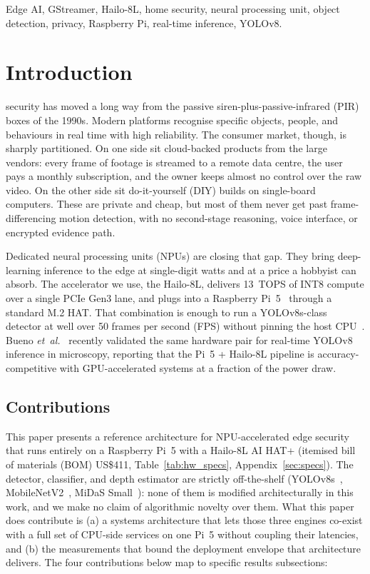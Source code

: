 \documentclass{ieeeaccess}
\begin{document}
\begin{keywords}
Edge AI, GStreamer, Hailo-8L, home security, neural processing unit, object detection, privacy, Raspberry Pi, real-time inference, YOLOv8.
\end{keywords}

\titlepgskip=-21pt

\maketitle

\section{Introduction}
\label{sec:introduction}
 security has moved a long way from the passive siren-plus-passive-infrared (PIR) boxes of the 1990s. Modern platforms recognise specific objects, people, and behaviours in real time with high reliability. The consumer market, though, is sharply partitioned. On one side sit cloud-backed products from the large vendors: every frame of footage is streamed to a remote data centre, the user pays a monthly subscription, and the owner keeps almost no control over the raw video. On the other side sit do-it-yourself (DIY) builds on single-board computers. These are private and cheap, but most of them never get past frame-differencing motion detection, with no second-stage reasoning, voice interface, or encrypted evidence path.

Dedicated neural processing units (NPUs) are closing that gap. They bring deep-learning inference to the edge at single-digit watts and at a price a hobbyist can absorb. The accelerator we use, the Hailo-8L, delivers 13~TOPS of INT8 compute over a single PCIe Gen3 lane, and plugs into a Raspberry Pi~5~\cite{b11} through a standard M.2 HAT. That combination is enough to run a YOLOv8s-class detector at well over 50 frames per second (FPS) without pinning the host CPU~\cite{b3}. Bueno \emph{et~al.}~\cite{b4} recently validated the same hardware pair for real-time YOLOv8 inference in microscopy, reporting that the Pi~5 + Hailo-8L pipeline is accuracy-competitive with GPU-accelerated systems at a fraction of the power draw.

\subsection{Contributions}
This paper presents a reference architecture for NPU-accelerated edge security that runs entirely on a Raspberry Pi~5 with a Hailo-8L AI HAT+ (itemised bill of materials (BOM) US\$411, Table~\ref{tab:hw_specs}, Appendix~\ref{sec:specs}). The detector, classifier, and depth estimator are strictly off-the-shelf (YOLOv8s~\cite{b9}, MobileNetV2~\cite{b15}, MiDaS Small~\cite{b14}): none of them is modified architecturally in this work, and we make no claim of algorithmic novelty over them. What this paper does contribute is (a) a systems architecture that lets those three engines co-exist with a full set of CPU-side services on one Pi~5 without coupling their latencies, and (b) the measurements that bound the deployment envelope that architecture delivers. The four contributions below map to specific results subsections:
\end{document}
